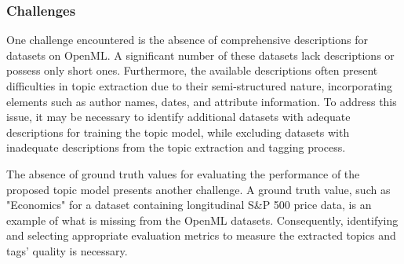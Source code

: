 \documentclass{article}
\begin{document}
\subsubsection{Challenges}
One challenge encountered is the absence of comprehensive descriptions for datasets on OpenML. A significant number of these datasets lack descriptions or possess only short ones. Furthermore, the available descriptions often present difficulties in topic extraction due to their semi-structured nature, incorporating elements such as author names, dates, and attribute information. To address this issue, it may be necessary to identify additional datasets with adequate descriptions for training the topic model, while excluding datasets with inadequate descriptions from the topic extraction and tagging process.

The absence of ground truth values for evaluating the performance of the proposed topic model presents another challenge. A ground truth value, such as "Economics" for a dataset containing longitudinal S\&P 500 price data, is an example of what is missing from the OpenML datasets. Consequently, identifying and selecting appropriate evaluation metrics to measure the extracted topics and tags' quality is necessary.






\end{document}
